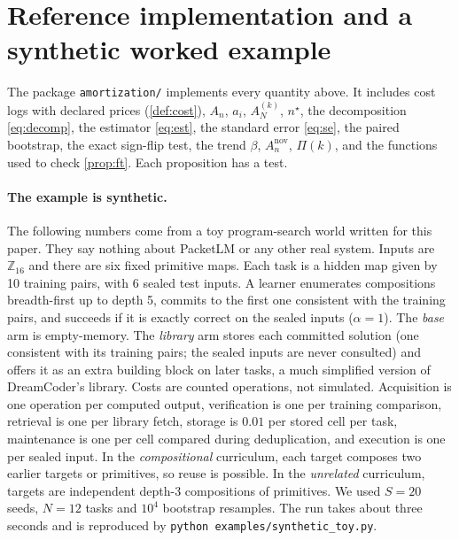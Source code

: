 \documentclass[11pt]{article}
\theoremstyle{remark}
\begin{document}
\section{Reference implementation and a synthetic worked example}\label{sec:toy}

The package \texttt{amortization/} implements every quantity above. It includes cost logs with declared prices (\cref{def:cost}), $A_n$, $a_i$, $A^{(k)}_N$, $n^\star$, the decomposition \eqref{eq:decomp}, the estimator \eqref{eq:est}, the standard error \eqref{eq:se}, the paired bootstrap, the exact sign-flip test, the trend $\beta$, $A_n^{\mathrm{nov}}$, $\Pi(k)$, and the functions used to check \cref{prop:ft}.
Each proposition has a test.

\paragraph{The example is synthetic.}
The following numbers come from a toy program-search world written for this paper. They say nothing about PacketLM or any other real system.
Inputs are $\mathbb{Z}_{16}$ and there are six fixed primitive maps.
Each task is a hidden map given by 10 training pairs, with 6 sealed test inputs.
A learner enumerates compositions breadth-first up to depth 5, commits to the first one consistent with the training pairs, and succeeds if it is exactly correct on the sealed inputs ($\alpha=1$).
The \emph{base} arm is empty-memory.
The \emph{library} arm stores each committed solution (one consistent with its training pairs; the sealed inputs are never consulted) and offers it as an extra building block on later tasks, a much simplified version of DreamCoder's library.
Costs are counted operations, not simulated.
Acquisition is one operation per computed output, verification is one per training comparison, retrieval is one per library fetch, storage is $0.01$ per stored cell per task, maintenance is one per cell compared during deduplication, and execution is one per sealed input.
In the \emph{compositional} curriculum, each target composes two earlier targets or primitives, so reuse is possible.
In the \emph{unrelated} curriculum, targets are independent depth-3 compositions of primitives.
We used $S=20$ seeds, $N=12$ tasks and $10^4$ bootstrap resamples. The run takes about three seconds and is reproduced by \texttt{python examples/synthetic\_toy.py}.
\end{document}
